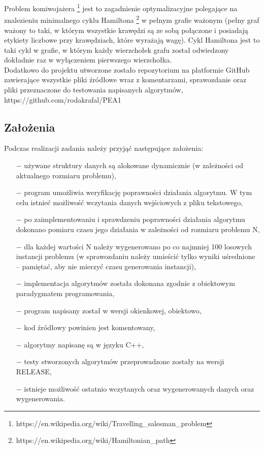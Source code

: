 \documentclass[a4paper,12pt]{article}
\begin{document}
Problem komiwojażera \footnote{https://en.wikipedia.org/wiki/Travelling\_salesman\_problem} 
jest to zagadnienie optymalizacyjne polegające na znalezieniu minimalnego cyklu 
Hamiltona \footnote{https://en.wikipedia.org/wiki/Hamiltonian\_path} w pełnym grafie 
ważonym (pełny graf ważony to taki, w którym wszystkie krawędzi są ze sobą połączone 
i posiadają etykiety liczbowe przy krawędziach, które wyrażają wagę). Cykl Hamiltona 
jest to taki cykl w grafie, w którym każdy wierzchołek grafu został odwiedzony 
dokładnie raz w wyłączeniem pierwszego wierzchołka. \\

Dodatkowo do projektu utworzone zostało repozytorium na platformie GitHub zawierające
wszystkie pliki źródłowe wraz z komentarzami, sprawozdanie oraz pliki przeznaczone do 
testowania napisanych algorytmów, https://github.com/rodakrafal/PEA1
\subsection{Założenia}
Podczas realizacji zadania należy przyjąć następujące założenia:
\begin{itemize}
    \item[$-$] używane struktury danych są alokowane dynamicznie (w zależności od aktualnego
    rozmiaru problemu),
    \item[$-$] program umożliwia weryfikację poprawności działania algorytmu. W tym celu
    istnieć możliwość wczytania danych wejściowych z pliku tekstowego,
    \item[$-$] po zaimplementowaniu i sprawdzeniu poprawności działania algorytmu dokonano
    pomiaru czasu jego działania w zależności od rozmiaru problemu N,
    \item[$-$] dla każdej wartości N należy wygenerowano po co najmniej 100 losowych instancji 
    problemu (w sprawozdaniu należy umieścić tylko wyniki uśrednione – pamiętać, aby nie mierzyć czasu
    generowania instancji),
    \item[$-$] implementacja algorytmów została dokonana zgodnie z obiektowym paradygmatem
    programowania, 
    \item[$-$] program napisany został w wersji okienkowej, obiektowo,
    \item[$-$] kod źródłowy powinien jest komentowany,
    \item[$-$] algorytmy napisanę są w języku C++,
    \item[$-$] testy stworzonych algorytmów przeprowadzone zostały na wersji RELEASE,
    \item[$-$] istnieje możliwość ostatnio wczytanych oraz wygenerowanych danych oraz wygenerowania.
      

\end{itemize}
\vfill
\end{document}
